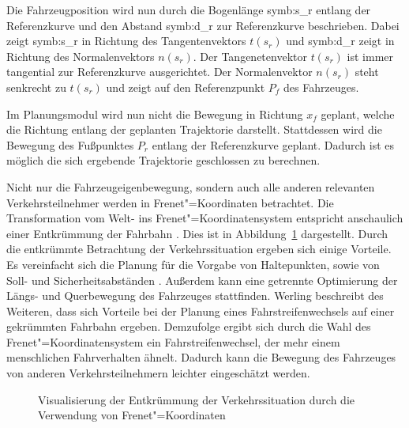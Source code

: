Die Fahrzeugposition wird nun durch die Bogenl\"ange \gls{symb:s_r} entlang der Referenzkurve und den Abstand \gls{symb:d_r} zur Referenzkurve beschrieben. 
Dabei zeigt \gls{symb:s_r} in Richtung des Tangentenvektors \(t({s_r})\) und \gls{symb:d_r} zeigt in Richtung des Normalenvektors \(n({s_r})\).
Der Tangenetenvektor \(t({s_r})\) ist immer tangential zur Referenzkurve ausgerichtet. 
Der Normalenvektor \(n({s_r})\) steht senkrecht zu \(t({s_r})\) und zeigt auf den Referenzpunkt \({P_f}\) des Fahrzeuges. \cite{Rathgeber2016}

Im Planungsmodul wird nun nicht die Bewegung in Richtung \(x_f\) geplant, welche die Richtung entlang der geplanten Trajektorie darstellt.
Stattdessen wird die Bewegung des Fu{\ss}punktes \(P_r\) entlang der Referenzkurve geplant. 
Dadurch ist es m\"oglich die sich ergebende Trajektorie geschlossen zu berechnen. \cite{Werling2011}

Nicht nur die Fahrzeugeigenbewegung, sondern auch alle anderen relevanten Verkehrsteilnehmer werden in Frenet"=Koordinaten betrachtet.
Die Transformation vom Welt- ins Frenet"=Koordinatensystem entspricht anschaulich einer Entkr\"ummung der Fahrbahn \cite{Rathgeber2016}. 
Dies ist in Abbildung~\ref{fig:Fahrbahnentkruemmung} dargestellt. 
Durch die entkr\"ummte Betrachtung der Verkehrssituation ergeben sich einige Vorteile. 
Es vereinfacht sich die Planung f\"ur die Vorgabe von Haltepunkten, sowie von Soll- und Sicherheitsabst\"anden \cite{Werling2011}. 
Au{\ss}erdem kann eine getrennte Optimierung der L\"angs- und Querbewegung des Fahrzeuges \cite{Rathgeber2016} stattfinden. 
Werling \cite{Werling2011} beschreibt des Weiteren, dass sich Vorteile bei der Planung eines Fahrstreifenwechsels auf einer gekr\"ummten Fahrbahn ergeben.
Demzufolge ergibt sich durch die Wahl des Frenet"=Koordinatensystem ein Fahrstreifenwechsel, der mehr einem menschlichen Fahrverhalten \"ahnelt.
Dadurch kann die Bewegung des Fahrzeuges von anderen Verkehrsteilnehmern leichter eingesch\"atzt werden.

\begin{figure}[!htbp]
    \centering
    \hfill
    \caption[Fahrbahnentkr\"ummung]{Visualisierung der Entkr\"ummung der Verkehrssituation durch die Verwendung von Frenet"=Koordinaten}
    \label{fig:Fahrbahnentkruemmung}
\end{figure}

